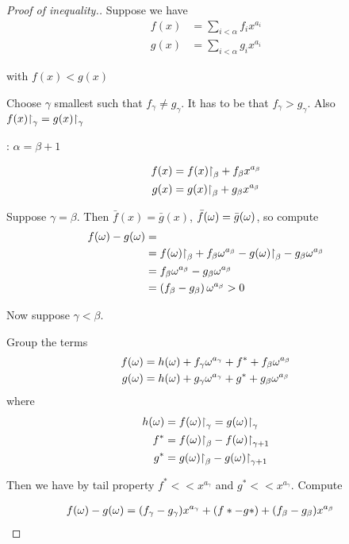 \begin{proof}[Proof of inequality.] %

Suppose we have
\begin{align*}
  f(x) &= \sum_{i < \alpha} f_i x^{a_i} \\
  g(x) &= \sum_{i < \alpha} g_i x^{a_i}
\end{align*}

with $f(x) < g(x)$

Choose $\gamma$ smallest such that $f_\gamma \neq g_\gamma$.
It has to be that $f_\gamma > g_\gamma$. Also $f(x)\mathord{\upharpoonright}_{\gamma} = g(x)\mathord{\upharpoonright}_{\gamma}$

: $\alpha = \beta + 1$

\begin{align*}
  f(x) &= f(x)\mathord{\upharpoonright}_{\beta} + f_\beta x^{a_\beta}\\
  g(x) &= g(x)\mathord{\upharpoonright}_{\beta} + g_\beta x^{a_\beta}
\end{align*}

Suppose $\gamma = \beta$.
Then $\bar f(x) = \bar g(x)$, $\bar f(\omega) = \bar g(\omega)$, so compute
\begin{align*}
  f(\omega) - g(\omega) &= \\
	&= f(\omega)\mathord{\upharpoonright}_{\beta} + f_\beta \omega^{a_\beta} - g(\omega)\mathord{\upharpoonright}_{\beta} - g_\beta \omega^{a_\beta} \\
	&= f_\beta \omega^{a_\beta} - g_\beta \omega^{a_\beta} \\
	&= \left( f_\beta - g_\beta \right) \omega^{a_\beta} > 0
\end{align*}

Now suppose $\gamma < \beta$.

Group the terms
\begin{align*}
  f(\omega) &= h(\omega) + f_\gamma \omega^{a_\gamma} + f^* + f_\beta \omega^{a_\beta} \\
  g(\omega) &= h(\omega) + g_\gamma \omega^{a_\gamma} + g^* + g_\beta \omega^{a_\beta}
\end{align*}
where
\begin{align*}
	h(\omega) &= f(\omega)\mathord{\upharpoonright}_{\gamma} = g(\omega)\mathord{\upharpoonright}_{\gamma} \\
	f^* &= f(\omega)\mathord{\upharpoonright}_{\beta} - f(\omega)\mathord{\upharpoonright}_{\gamma + 1} \\
	g^* &= g(\omega)\mathord{\upharpoonright}_{\beta} - g(\omega)\mathord{\upharpoonright}_{\gamma + 1}
\end{align*}

Then we have by tail property $f^* << x^{a_\gamma}$ and $g^* << x^{a_\gamma}$. Compute

\begin{align*}
  f(\omega) - g(\omega) &= (f_\gamma - g_\gamma) x^{a_\gamma} + (f* - g*) + (f_\beta - g_\beta) x^{a_\beta}
\end{align*}


\end{proof}
